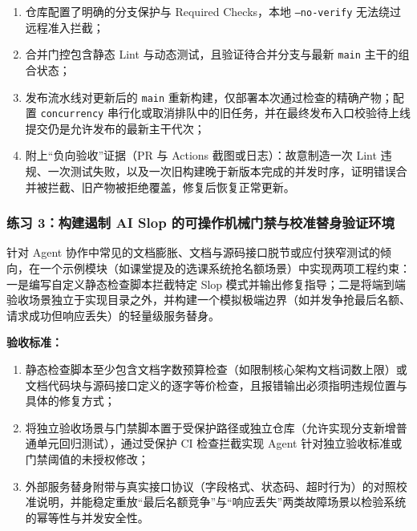 \documentclass[UTF8,a4paper,11pt,fontset=fandol]{ctexart}
\begin{document}
\begin{enumerate}
\item 仓库配置了明确的分支保护与 Required Checks，本地 \texttt{--no-verify} 无法绕过远程准入拦截；

\item 合并门控包含静态 Lint 与动态测试，且验证待合并分支与最新 \texttt{main} 主干的组合状态；

\item 发布流水线对更新后的 \texttt{main} 重新构建，仅部署本次通过检查的精确产物；配置 \texttt{concurrency} 串行化或取消排队中的旧任务，并在最终发布入口校验待上线提交仍是允许发布的最新主干代次；

\item 附上“负向验收”证据（PR 与 Actions 截图或日志）：故意制造一次 Lint 违规、一次测试失败，以及一次旧构建晚于新版本完成的并发时序，证明错误合并被拦截、旧产物被拒绝覆盖，修复后恢复正常更新。
\end{enumerate}

\subsubsection*{练习 3：构建遏制 AI Slop 的可操作机械门禁与校准替身验证环境}

针对 Agent 协作中常见的文档膨胀、文档与源码接口脱节或应付狭窄测试的倾向，在一个示例模块（如课堂提及的选课系统抢名额场景）中实现两项工程约束：一是编写自定义静态检查脚本拦截特定 Slop 模式并输出修复指导；二是将端到端验收场景独立于实现目录之外，并构建一个模拟极端边界（如并发争抢最后名额、请求成功但响应丢失）的轻量级服务替身。

\par{}\textbf{验收标准：}

\begin{enumerate}
\item 静态检查脚本至少包含文档字数预算检查（如限制核心架构文档词数上限）或文档代码块与源码接口定义的逐字等价检查，且报错输出必须指明违规位置与具体的修复方式；

\item 将独立验收场景与门禁脚本置于受保护路径或独立仓库（允许实现分支新增普通单元回归测试），通过受保护 CI 检查拦截实现 Agent 针对独立验收标准或门禁阈值的未授权修改；

\item 外部服务替身附带与真实接口协议（字段格式、状态码、超时行为）的对照校准说明，并能稳定重放“最后名额竞争”与“响应丢失”两类故障场景以检验系统的幂等性与并发安全性。
\end{enumerate}
\end{document}
